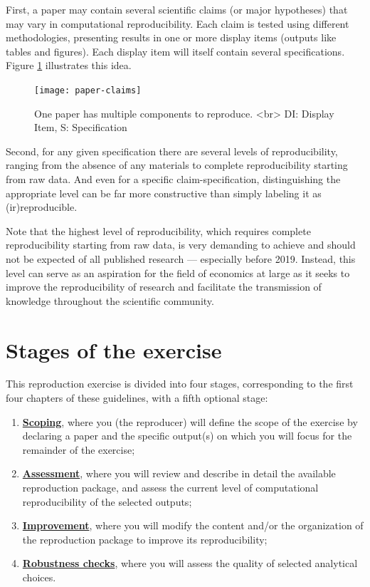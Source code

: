 \documentclass[]{book}
\providecommand{\tightlist}{%
  \setlength{\itemsep}{0pt}\setlength{\parskip}{0pt}}
\begin{document}
First, a paper may contain several scientific claims (or major hypotheses) that may vary in computational reproducibility. Each claim is tested using different methodologies, presenting results in one or more display items (outputs like tables and figures). Each display item will itself contain several specifications. Figure \ref{fig:diagram} illustrates this idea.

\begin{figure}
\texttt{[image: paper-claims]} \caption{One paper has multiple components to reproduce. <br> DI: Display Item, S: Specification }\label{fig:diagram}
\end{figure}

Second, for any given specification there are several levels of reproducibility, ranging from the absence of any materials to complete reproducibility starting from raw data. And even for a specific claim-specification, distinguishing the appropriate level can be far more constructive than simply labeling it as (ir)reproducible.

Note that the highest level of reproducibility, which requires complete reproducibility starting from raw data, is very demanding to achieve and should not be expected of all published research --- especially before 2019. Instead, this level can serve as an aspiration for the field of economics at large as it seeks to improve the reproducibility of research and facilitate the transmission of knowledge throughout the scientific community.

\hypertarget{stages-of-the-exercise}{%
\section*{Stages of the exercise}\label{stages-of-the-exercise}}

This reproduction exercise is divided into four stages, corresponding to the first four chapters of these guidelines, with a fifth optional stage:

\begin{enumerate}
\def\labelenumi{\arabic{enumi}.}
\tightlist
\item
  \protect\hyperlink{scoping}{\textbf{Scoping}}, where you (the reproducer) will define the scope of the exercise by declaring a paper and the specific output(s) on which you will focus for the remainder of the exercise;\\
\item
  \protect\hyperlink{assessment}{\textbf{Assessment}}, where you will review and describe in detail the available reproduction package, and assess the current level of computational reproducibility of the selected outputs;
\item
  \protect\hyperlink{improvements}{\textbf{Improvement}}, where you will modify the content and/or the organization of the reproduction package to improve its reproducibility;\\
\item
  \protect\hyperlink{robust}{\textbf{Robustness checks}}, where you will assess the quality of selected analytical choices.
\end{enumerate}
\end{document}
